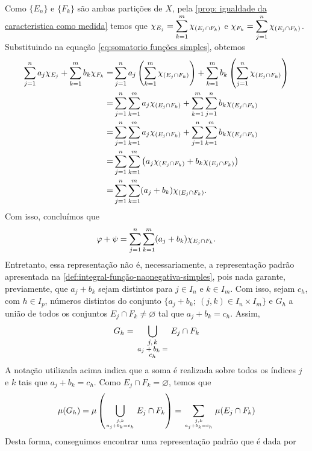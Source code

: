 \begin{prova}
    Como $\{E_n\}$ e $\{F_k\}$ são ambas partições de $X$, pela \ref{prop: igualdade da caracteristica como medida} temos que
    $\chi_{E_j} = \displaystyle \sum_{k = 1}^m \chi_{(E_j \cap F_k)}$ e 
    $\chi_{F_k} = \displaystyle \sum_{j = 1}^n \chi_{(E_j \cap F_k)}$.
    Substituindo na equação \ref{eq:somatorio funções simples}, obtemos    
    \begin{align*}
    	\displaystyle \sum_{j = 1}^n a_j\chi_{E_j}
    	+
    	\displaystyle \sum_{k = 1}^m b_k\chi_{F_k}
    	= &
    	\displaystyle \sum_{j = 1}^n a_j\left(\displaystyle \sum_{k = 1}^m \chi_{(E_j \cap F_k)}\right)
    	+
    	\displaystyle \sum_{k = 1}^m b_k\left(\displaystyle \sum_{j = 1}^n \chi_{(E_j \cap F_k)}\right)\\
    	= &
    	\displaystyle \sum_{j = 1}^n\displaystyle \sum_{k = 1}^m a_j\chi_{(E_j \cap F_k)}
    	+
    	\displaystyle \sum_{k = 1}^m \displaystyle \sum_{j = 1}^n b_k\chi_{(E_j \cap F_k)}\\
    	= &
    	\displaystyle \sum_{j = 1}^n\displaystyle \sum_{k = 1}^m a_j\chi_{(E_j \cap F_k)}
    	+
    	\displaystyle \sum_{j = 1}^n \displaystyle \sum_{k = 1}^m  b_k\chi_{(E_j \cap F_k)}\\
		= &
		\displaystyle \sum_{j = 1}^n\displaystyle \sum_{k = 1}^m 
		\left(a_j\chi_{(E_j \cap F_k)}
		+
		b_k\chi_{(E_j \cap F_k)}\right)\\
		= &
		\displaystyle \sum_{j = 1}^n\displaystyle \sum_{k = 1}^m 
		(a_j + b_k)\chi_{(E_j \cap F_k)}.
	\end{align*}
    Com isso, concluímos que
    $$
    \varphi + \psi = \displaystyle \sum_{j = 1}^n\displaystyle \sum_{k = 1}^m(a_j + b_k)\chi_{E_j \cap F_k}.
    $$
    Entretanto, essa representação não é, necessariamente, a representação padrão apresentada na \ref{def:integral-função-naonegativa-simples}, pois 
    nada garante, previamente, que $a_j + b_k$ sejam distintos para $j \in I_n$ e $k \in I_m$.
    Com isso, sejam $c_h$, com $h \in I_p$, números distintos do conjunto $\{a_j + b_k; \ (j,k) \in I_n \times I_m\}$ e $G_h$ a união de todos os conjuntos $E_j \cap F_k \neq \varnothing$ tal que $a_j + b_k = c_h$.
    Assim, 
    $$
    G_h = \bigcup_{\begin{minipage}{1.4cm}
        \fontsize{8}{5}\selectfont
        \centering
        $j,k$
        $a_j + b_k = c_h$
    \end{minipage}} E_j \cap F_k
    $$
    A notação utilizada acima indica que a soma é realizada sobre todos os índices $j$ e $k$ tais que $a_j + b_k =c_h$.
    Como $E_j \cap F_k = \varnothing$, temos que 
    $$
    \mu(G_h) = \mu\left(\bigcup_{
        j,k\atop
        a_j + b_k = c_h} E_j \cap F_k
    \right)
    = 
    \sum_{
        j,k\atop
        a_j + b_k = c_h} \mu(E_j \cap F_k)
    $$
    Desta forma, conseguimos encontrar uma representação padrão que é dada por 

\end{prova}
